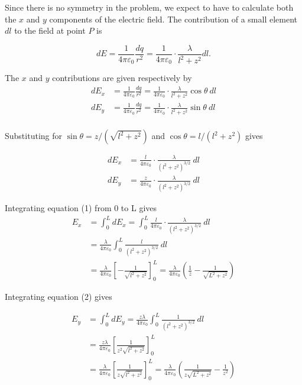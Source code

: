 \documentclass{article}
\begin{document}


Since there is no symmetry in the problem, we expect to have to calculate both the $x$ and $y$ components of the electric field. The contribution of a small element $dl$ to the field at point $P$ is

$$
dE = \frac{1}{4\pi\varepsilon_0}\frac{dq}{r^2} = \frac{1}{4\pi\varepsilon_0}\cdot\frac{\lambda}{l^2 + z^2}dl.
$$

The $x$ and $y$ contributions are given respectively by 
\begin{align*}
    dE_x &= \frac{1}{4\pi\varepsilon_0}\frac{dq}{r^2} = \frac{1}{4\pi\varepsilon_0}\cdot\frac{\lambda}{l^2 + z^2}\cos\theta\ dl \\
    dE_y &= \frac{1}{4\pi\varepsilon_0}\frac{dq}{r^2} = \frac{1}{4\pi\varepsilon_0}\cdot\frac{\lambda}{l^2 + z^2}\sin\theta\ dl \\
\end{align*}

Substituting for $\sin\theta = z/(\sqrt{l^2 + z^2})$ and $\cos \theta = l/(l^2 + z^2)$ gives

\begin{align}
    dE_x &= \frac{l}{4\pi\varepsilon_0}\cdot\frac{\lambda}{(l^2 + z^2)^{3/2}}\ dl \\
    dE_y &= \frac{z}{4\pi\varepsilon_0}\cdot\frac{\lambda}{(l^2 + z^2)^{3/2}}\ dl
\end{align}

Integrating equation (1) from 0 to L gives 
\begin{align*}
    E_x &= \int_{0}^{L}dE_x = \int_{0}^{L} \frac{l}{4\pi\varepsilon_0}\cdot\frac{\lambda}{(l^2 + z^2)^{3/2}}\ dl \\
    &= \frac{\lambda}{4\pi\varepsilon_0}\int_{0}^{L}\frac{l}{(l^2 + z^2)^{3/2}}\ dl \\
    &= \frac{\lambda}{4\pi\varepsilon_0} \left[ -\frac{1}{\sqrt{l^2 + z^2}} \right]_{0}^L = \frac{\lambda}{4\pi\varepsilon_0}\left( \frac{1}{z} - \frac{1}{\sqrt{L^2 + z^2}}\right)
\end{align*}

Integrating equation (2) gives

\begin{align*}
    E_y &= \int_0^L dE_y = \frac{z\lambda}{4\pi\varepsilon_0}\int_0^L \frac{1}{(l^2 + z^2)^{3/2}}\ dl \\
    &= \frac{z\lambda}{4\pi\varepsilon_0} \left[ \frac{1}{z^2\sqrt{l^2 + z^2}}\right]^L_0\\
    &= \frac{\lambda}{4\pi\varepsilon_0} \left[ \frac{1}{z\sqrt{l^2 + z^2}}\right]^L_0 = \frac{\lambda}{4\pi\varepsilon_0} \left( \frac{1}{z\sqrt{L^2 + z^2}} - \frac{1}{z^2} \right)
\end{align*}
\end{document}
